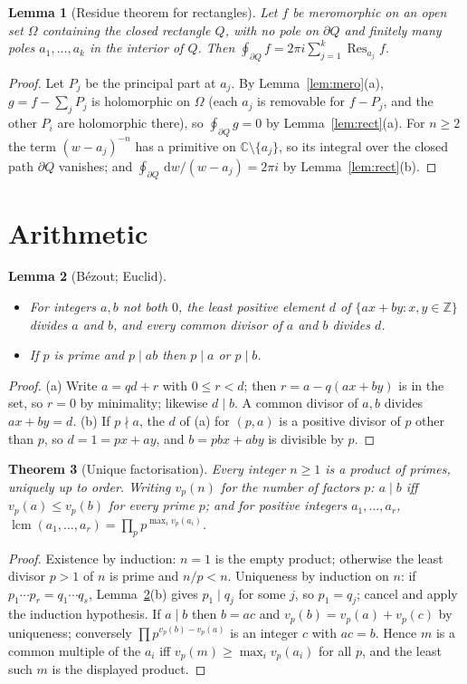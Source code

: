 \documentclass[11pt]{article}
\newtheorem{theorem}{Theorem}[section]
\newtheorem{lemma}[theorem]{Lemma}
\theoremstyle{definition}
\newcommand{\C}{\mathbb{C}}
\newcommand{\Z}{\mathbb{Z}}
\newcommand{\res}{\operatorname{Res}}
\newcommand{\lcm}{\operatorname{lcm}}
\newcommand{\dd}{\,\mathrm{d}}
\begin{document}
\begin{lemma}[Residue theorem for rectangles]\label{lem:residue}
Let $f$ be meromorphic on an open set $\Omega$ containing the closed rectangle $Q$, with no pole on $\partial Q$ and finitely many poles $a_1,\dots,a_k$ in the interior of $Q$. Then
$\oint_{\partial Q}f=2\pi i\sum_{j=1}^{k}\res_{a_j}f$.
\end{lemma}
\begin{proof}
Let $P_j$ be the principal part at $a_j$. By Lemma~\ref{lem:mero}(a), $g=f-\sum_jP_j$ is holomorphic on $\Omega$ (each $a_j$ is removable for $f-P_j$, and the other $P_i$ are holomorphic there), so $\oint_{\partial Q}g=0$ by Lemma~\ref{lem:rect}(a).
For $n\ge2$ the term $(w-a_j)^{-n}$ has a primitive on $\C\setminus\{a_j\}$, so its integral over the closed path $\partial Q$ vanishes; and $\oint_{\partial Q}\dd w/(w-a_j)=2\pi i$ by Lemma~\ref{lem:rect}(b).
\end{proof}

\section{Arithmetic}\label{sec:arith}

\begin{lemma}[B\'ezout; Euclid]\label{lem:euclid}
\begin{itemize}
\item[(a)] For integers $a,b$ not both $0$, the least positive element $d$ of $\{ax+by:x,y\in\Z\}$ divides $a$ and $b$, and every common divisor of $a$ and $b$ divides $d$.
\item[(b)] If $p$ is prime and $p\mid ab$ then $p\mid a$ or $p\mid b$.
\end{itemize}
\end{lemma}
\begin{proof}
(a) Write $a=qd+r$ with $0\le r<d$; then $r=a-q(ax+by)$ is in the set, so $r=0$ by minimality; likewise $d\mid b$. A common divisor of $a,b$ divides $ax+by=d$.
(b) If $p\nmid a$, the $d$ of (a) for $(p,a)$ is a positive divisor of $p$ other than $p$, so $d=1=px+ay$, and $b=pbx+aby$ is divisible by $p$.
\end{proof}

\begin{theorem}[Unique factorisation]\label{thm:uf}
Every integer $n\ge1$ is a product of primes, uniquely up to order. Writing $v_p(n)$ for the number of factors $p$: $a\mid b$ iff $v_p(a)\le v_p(b)$ for every prime $p$; and for positive integers $a_1,\dots,a_r$, $\lcm(a_1,\dots,a_r)=\prod_p p^{\max_iv_p(a_i)}$.
\end{theorem}
\begin{proof}
Existence by induction: $n=1$ is the empty product; otherwise the least divisor $p>1$ of $n$ is prime and $n/p<n$.
Uniqueness by induction on $n$: if $p_1\cdots p_r=q_1\cdots q_s$, Lemma~\ref{lem:euclid}(b) gives $p_1\mid q_j$ for some $j$, so $p_1=q_j$; cancel and apply the induction hypothesis.
If $a\mid b$ then $b=ac$ and $v_p(b)=v_p(a)+v_p(c)$ by uniqueness; conversely $\prod p^{v_p(b)-v_p(a)}$ is an integer $c$ with $ac=b$.
Hence $m$ is a common multiple of the $a_i$ iff $v_p(m)\ge\max_iv_p(a_i)$ for all $p$, and the least such $m$ is the displayed product.
\end{proof}
\end{document}
